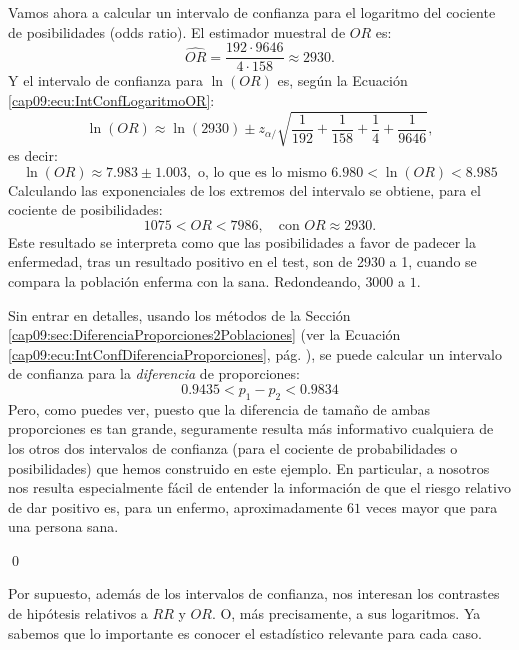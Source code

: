\begin{ejemplo}
Vamos ahora a calcular un intervalo de confianza para el logaritmo del cociente de posibilidades (odds ratio). El estimador muestral de $OR$ es:
\[\widehat{OR} = \dfrac{192\cdot 9646}{4\cdot 158}\approx 2930.\]
Y el intervalo de confianza para $\ln(OR)$ es, según la Ecuación \ref{cap09:ecu:IntConfLogaritmoOR}:
\[
        \ln(OR)\approx
        \ln\left(2930\right)\pm z_{\alpha/}
        \sqrt{\dfrac{1}{192}+\dfrac{1}{158}+\dfrac{1}{4}+\dfrac{1}{9646}},
\]
es decir:
\[
\ln(OR)\approx 7.983\pm 1.003,\mbox{ o, lo que es lo mismo } 6.980<\ln(OR)<8.985
\]
Calculando las exponenciales de los extremos del intervalo se obtiene, para el cociente de posibilidades:
\[1075< OR < 7986, \quad \mbox {con } OR\approx 2930.\]
Este resultado se interpreta como que las posibilidades a favor de padecer la enfermedad, tras un resultado positivo en el test, son de 2930 a 1, cuando se compara la población enferma con la sana.  Redondeando, $3000$ a $1$.

Sin entrar en detalles, usando los métodos de la Sección \ref{cap09:sec:DiferenciaProporciones2Poblaciones} (ver la Ecuación \ref{cap09:ecu:IntConfDiferenciaProporciones}, pág. \pageref{cap09:ecu:IntConfDiferenciaProporciones}), se puede calcular un intervalo de confianza para la {\em diferencia} de proporciones:
\[0.9435 < p_1-p_2 <0.9834\]
Pero, como puedes ver, puesto que la diferencia de tamaño de ambas proporciones es tan grande, seguramente resulta más informativo cualquiera de los otros dos intervalos de confianza (para el cociente de probabilidades o posibilidades) que hemos construido en este ejemplo. En particular, a nosotros nos resulta especialmente fácil de entender la información de que el riesgo relativo de dar positivo es, para un enfermo, aproximadamente $61$ veces mayor que para una persona sana.

\qed
\end{ejemplo}

Por supuesto, además de los intervalos de confianza, nos interesan los contrastes de hipótesis relativos a $RR$ y $OR$. O, más precisamente, a sus logaritmos. Ya sabemos que lo importante es conocer el estadístico relevante para cada caso.


